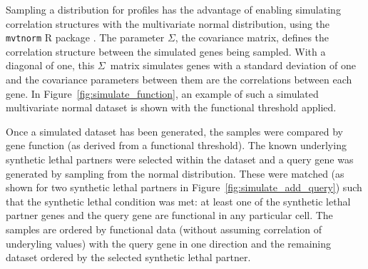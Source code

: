 Sampling a distribution for  profiles has the advantage of enabling simulating correlation structures with the multivariate normal distribution, using the \texttt{mvtnorm} R package \citep{Genz2009, mvtnorm}. The parameter $\Sigma$, the covariance matrix, defines the correlation structure between the simulated genes being sampled. With a diagonal of one, this $\Sigma$\ matrix simulates genes with a standard deviation of one and the covariance parameters between them are the correlations between each gene. In Figure~\ref{fig:simulate_function}, an example of such a simulated multivariate normal dataset is shown with the functional threshold applied.

Once a simulated dataset has been generated, the samples were compared by gene function (as derived from a functional threshold). The known underlying \gls{synthetic lethal} partners were selected within the dataset and a query gene was generated by sampling from the normal distribution. These were matched (as shown for two \gls{synthetic lethal} partners in Figure~\ref{fig:simulate_add_query}) such that the \gls{synthetic lethal} condition was met: at least one of the \gls{synthetic lethal} partner genes and the query gene are functional in any particular cell. The samples are ordered by functional data (without assuming correlation of underyling  values) with the query gene in one direction and the remaining dataset ordered by the selected \gls{synthetic lethal} partner.


